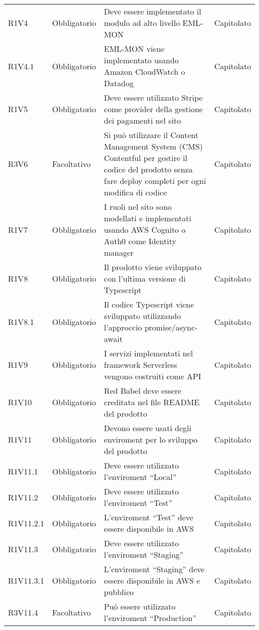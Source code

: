 {\begin{longtable}{C{2.5cm} C{2.8cm} C{6.7cm} C{2.5cm}}
R1V4 & Obbligatorio & Deve essere implementato il modulo ad alto livello EML-MON & Capitolato \\
R1V4.1 & Obbligatorio & EML-MON viene implementato usando Amazon CloudWatch o  Datadog & Capitolato \\

R1V5 & Obbligatorio & Deve essere utilizzato Stripe come provider della gestione dei pagamenti nel sito & Capitolato \\

R3V6 & Facoltativo & Si può utilizzare il Content Management System (CMS) Contentful per gestire il codice del prodotto senza fare deploy completi per ogni modifica di codice & Capitolato \\

R1V7 & Obbligatorio & I ruoli nel sito sono modellati e implementati usando AWS Cognito o Auth0 come Identity manager & Capitolato \\

R1V8 & Obbligatorio & Il prodotto viene sviluppato con l'ultima versione di Typescript & Capitolato \\
R1V8.1 & Obbligatorio & Il codice Typescript viene sviluppato utilizzando l'approccio promise/async-await & Capitolato \\

R1V9 & Obbligatorio & I servizi implementati nel framework Serverless vengono costruiti come API & Capitolato \\

R1V10 & Obbligatorio & Red Babel deve essere creditata nel file README del prodotto & Capitolato \\

R1V11 & Obbligatorio & Devono essere usati degli enviroment per lo sviluppo del prodotto & Capitolato \\
R1V11.1 & Obbligatorio & Deve essere utilizzato l'enviroment ``Local'' & Capitolato \\
R1V11.2 & Obbligatorio & Deve essere utilizzato l'enviroment ``Test'' & Capitolato \\
R1V11.2.1 & Obbligatorio & L'enviroment ``Test'' deve essere disponibile in AWS & Capitolato \\
R1V11.3 & Obbligatorio & Deve essere utilizzato l'enviroment ``Staging'' & Capitolato \\
R1V11.3.1 & Obbligatorio & L'enviroment ``Staging'' deve essere disponibile in AWS e pubblico & Capitolato \\
R3V11.4 & Facoltativo & Può essere utilizzato l'enviroment ``Production'' & Capitolato \\


\end{longtable}}
